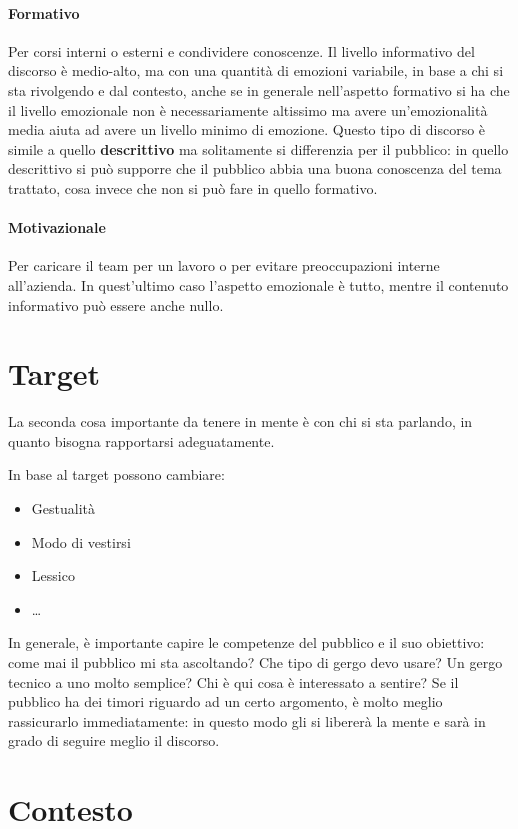 \paragraph*{Formativo} Per corsi interni o esterni e condividere conoscenze. Il
livello informativo del discorso è medio-alto, ma con una quantità di emozioni
variabile, in base a chi si sta rivolgendo e dal contesto, anche se in generale
nell'aspetto formativo si ha che il livello emozionale non è necessariamente
altissimo ma avere un'emozionalità media aiuta ad avere un livello minimo di
emozione. Questo tipo di discorso è simile a quello \textbf{descrittivo} ma
solitamente si differenzia per il pubblico: in quello descrittivo si può
supporre che il pubblico abbia una buona conoscenza del tema trattato, cosa
invece che non si può fare in quello formativo.

\paragraph*{Motivazionale} Per caricare il team per un lavoro o per evitare
preoccupazioni interne all'azienda. In quest'ultimo caso l'aspetto emozionale è
tutto, mentre il contenuto informativo può essere anche nullo.

\section{Target}
La seconda cosa importante da tenere in mente è con chi si sta parlando, in
quanto bisogna rapportarsi adeguatamente.

In base al target possono cambiare:
\begin{itemize}
 \item Gestualità
 \item Modo di vestirsi
 \item Lessico
 \item \dots
\end{itemize}

In generale, è importante capire le competenze del pubblico e il suo obiettivo:
come mai il pubblico mi sta ascoltando? Che tipo di gergo devo usare? Un gergo
tecnico a uno molto semplice? Chi è qui cosa è interessato a sentire? Se il
pubblico ha dei timori riguardo ad un certo argomento, è molto meglio
rassicurarlo immediatamente: in questo modo gli si libererà la mente e sarà in
grado di seguire meglio il discorso.

\section{Contesto}


